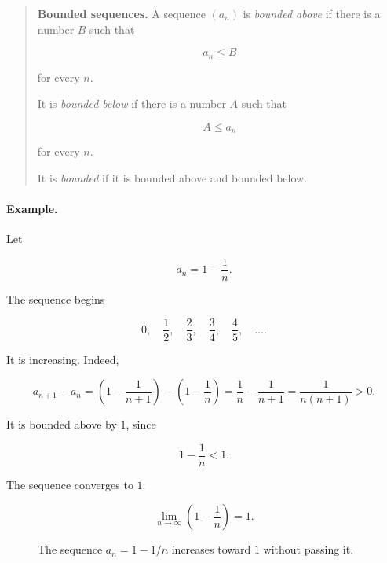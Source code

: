 \begin{quote}
\textbf{Bounded sequences.}
A sequence \((a_n)\) is \emph{bounded above} if there is a number \(B\) such that

\[
a_n\le B
\]

for every \(n\).

It is \emph{bounded below} if there is a number \(A\) such that

\[
A\le a_n
\]

for every \(n\).

It is \emph{bounded} if it is bounded above and bounded below.
\end{quote}

\paragraph{Example.}
Let

\[
a_n=1-\frac1n.
\]

The sequence begins

\[
0,\quad \frac12,\quad \frac23,\quad \frac34,\quad \frac45,\quad \ldots.
\]

It is increasing.  Indeed,

\[
a_{n+1}-a_n
=
\left(1-\frac1{n+1}\right)-\left(1-\frac1n\right)
=
\frac1n-\frac1{n+1}
=
\frac1{n(n+1)}
>
0.
\]

It is bounded above by \(1\), since

\[
1-\frac1n<1.
\]

The sequence converges to \(1\):

\[
\lim_{n\to\infty}\left(1-\frac1n\right)=1.
\]

\begin{figure}[h]
\centering
{}
\caption{The sequence \(a_n=1-1/n\) increases toward \(1\) without passing it.}
\label{fig:monotone-bounded-sequence}
\end{figure}

